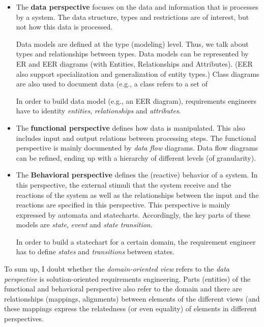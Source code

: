 \documentclass{llncs} %
\begin{document}
\begin{itemize}
	\item The \textbf{data perspective} focuses on the data and information that is processes by
	 a system. The data structure, types and restrictions are of interest, but not
	 how this data is processed.
	
	
	  Data models are defined at the type (modeling) level. Thus, we talk about types and
		relationships between types. Data models can be represented by ER and EER diagrams
		  (with \textsf{Entities}, \textsf{Relationships} and \textsf{Attributes}). 
			(EER also support specialization and generalization of entity types.)
			 Class diagrams are also used to document data (e.g., a class refers to a set of 
		
    In order to build data model (e.g., an EER diagram), requirements engineers have to
		 identity \emph{entities}, \emph{relationships} and \emph{attributes}.
		
	\item The \textbf{functional perspective} defines how data is manipulated. This also includes input and output
	 relations between processing steps. The functional perspective is mainly documented by \emph{data flow} diagrams.
	Data flow diagrams can be refined, ending up with a hierarchy of different levels (of granularity).
	   
		
		
	\item The \textbf{Behavioral perspective} defines the (reactive) behavior of a system. In this perspective,
	  the external stimuli that the system receive and the reactions of the system as well as the relationships
		 between the input and the reactions are specified in this perspective. 
		This perspective is mainly expressed by automata and statecharts.
		Accordingly, the key parts of these models are \emph{state}, \emph{event} and \emph{state transition}.
		
		In order to build a statechart for a certain domain, the requirement engineer has to
		   define \emph{states} and \emph{transitions} between states.
		
\end{itemize}

To sum up, I doubt whether the \emph{domain-oriented view} refers to the \emph{data perspective} is
solution-oriented requirements engineering. Parts (entities) of the functional and behavioral perspective
also refer to the domain and there are relationships (mappings, alignments) between elements
of the different views (and these mappings express the relatedness (or even equality) of elements
in different perspectives.





\end{document}

